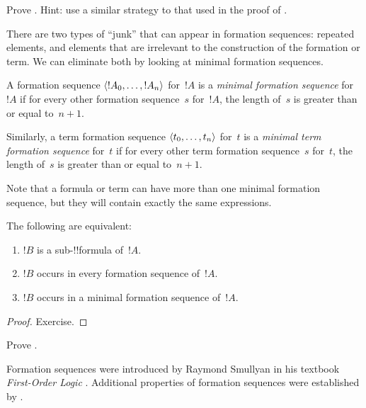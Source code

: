 \documentclass[../../../include/open-logic-section]{subfiles}
\begin{document}
\begin{prob}
Prove .
Hint: use a similar strategy to that used in the proof of
.
\end{prob}

There are two types of ``junk'' that can appear in formation
sequences: repeated elements, and elements that are irrelevant
to the construction of the formation or term. We can eliminate
both by looking at minimal formation sequences.

\begin{defn}
A formation sequence $\langle !A_0, \ldots, !A_n \rangle$ for~$!A$
is a \emph{minimal formation sequence} for~$!A$
if for every other formation sequence~$s$ for~$!A$, the length
of~$s$ is greater than or equal to~$n+1$.

Similarly, a term formation sequence $\langle t_0, \ldots, t_n \rangle$
for~$t$ is a \emph{minimal term formation sequence} for~$t$
if for every other term formation sequence~$s$ for~$t$, the
length of~$s$ is greater than or equal to~$n+1$.
\end{defn}

Note that a formula or term can have more than one minimal
formation sequence, but they will contain exactly the same
expressions.

\begin{prop}
The following are equivalent:
\begin{enumerate}
    \item $!B$ is a sub-!!{formula} of~$!A$.
    \item $!B$ occurs in every formation sequence of~$!A$.
    \item $!B$ occurs in a minimal formation sequence of~$!A$.
\end{enumerate}
\end{prop}

\begin{proof}
Exercise.
\end{proof}

\begin{prob}
Prove .
\end{prob}

\begin{history}
Formation sequences were introduced by Raymond Smullyan in his
textbook \emph{First-Order Logic} \citep{Smullyan1968}.
Additional properties of formation sequences were established by
\citet{Zuckerman1973}.
\end{history}
\end{document}
